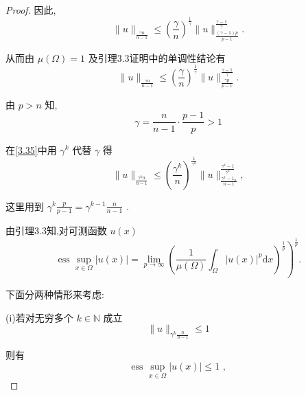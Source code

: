\documentclass[lang=cn,newtx,10pt,scheme=chinese,thmcnt=chapter]{elegantbook}
\newcommand{\dif}{\mathrm{d}}
\begin{document}
\begin{proof}
因此,
\begin{equation*}
\parallel u{\parallel }_{\frac{\gamma n}{n - 1}} \leqslant  {\left( \frac{\gamma }{n}\right) }^{\frac{1}{\gamma }}\parallel u{\parallel }_{\frac{\left( {\gamma  - 1}\right) p}{p - 1}}^{\frac{\gamma  - 1}{\gamma }}.
\end{equation*}

从而由 \(\mu \left( \Omega \right)  = 1\) 及引理3.3证明中的单调性结论有
\begin{equation}
\parallel u{\parallel }_{\frac{\gamma n}{n - 1}} \leqslant  {\left( \frac{\gamma }{n}\right) }^{\frac{1}{\gamma }}\parallel u{\parallel }_{\frac{\gamma p}{p - 1}}^{\frac{\gamma  - 1}{\gamma }}. \label{3.35}
\end{equation}

由 \(p > n\) 知,
\begin{equation*}
\gamma  = \frac{n}{n - 1} \cdot  \frac{p - 1}{p} > 1
\end{equation*}

在\ref{3.35}中用 \({\gamma }^{k}\) 代替 \(\gamma\) 得
\begin{equation}
\parallel u{\parallel }_{\frac{{\gamma }^{k}n}{n - 1}} \leqslant  {\left( \frac{{\gamma }^{k}}{n}\right) }^{\frac{1}{{\gamma }^{k}}}\parallel u{\parallel }_{\frac{{\gamma }^{k} - {1}_{n}}{n - 1}}^{\frac{{\gamma }^{k} - 1}{{\gamma }^{k}}}, \label{3.36}
\end{equation}

这里用到 \({\gamma }^{k}\frac{p}{p - 1} = {\gamma }^{k - 1}\frac{n}{n - 1}\) .

由引理3.3知,对可测函数 \(u\left( x\right)\)
\begin{equation}
{\left. \operatorname{ess}\mathop{\sup }\limits_{{x \in  \Omega }}\left| u\left( x\right) \right|  = \mathop{\lim }\limits_{{p \rightarrow  \infty }}{\left( \frac{1}{\mu \left( \Omega \right) }{\int }_{\Omega }{\left| u\left( x\right) \right| }^{p}\dif x\right) }^{\frac{1}{p}}\right) }^{\frac{1}{p}}. \label{3.37}
\end{equation}

下面分两种情形来考虑:

(i)若对无穷多个 \(k \in  \mathbb{N}\) 成立
\begin{equation*}
\parallel u{\parallel }_{{\gamma }^{k}\frac{n}{n - 1}} \leqslant  1
\end{equation*}

则有
\begin{equation*}
\text{ ess }\mathop{\sup }\limits_{{x \in  \Omega }}\left| {u\left( x\right) }\right|  \leqslant  1\text{ , }
\end{equation*}


\end{proof}
\end{document}
